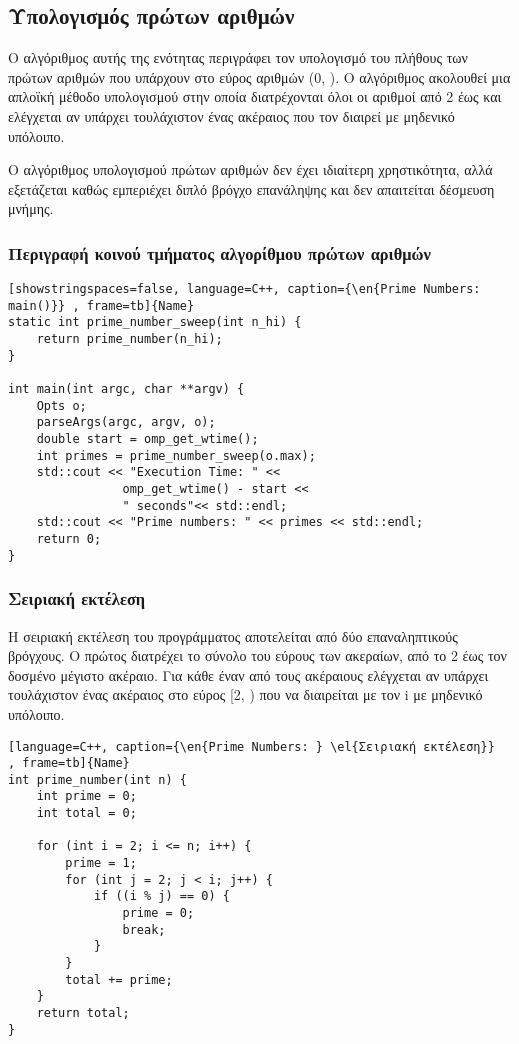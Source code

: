 \subsection{Υπολογισμός πρώτων αριθμών}
Ο αλγόριθμος αυτής της ενότητας περιγράφει τον υπολογισμό του πλήθους των πρώτων αριθμών που υπάρχουν στο εύρος αριθμών (0, ). Ο αλγόριθμος ακολουθεί μια απλοϊκή μέθοδο υπολογισμού στην οποία διατρέχονται όλοι οι αριθμοί από 2 έως  και ελέγχεται αν υπάρχει τουλάχιστον ένας ακέραιος που τον διαιρεί με μηδενικό υπόλοιπο.

Ο αλγόριθμος υπολογισμού πρώτων αριθμών δεν έχει ιδιαίτερη χρηστικότητα, αλλά εξετάζεται καθώς εμπεριέχει διπλό βρόγχο επανάληψης και δεν απαιτείται δέσμευση μνήμης.
\subsubsection{Περιγραφή κοινού τμήματος αλγορίθμου πρώτων αριθμών}
\begin{spacing}{1.0}
\begin{lstlisting}[showstringspaces=false, language=C++, caption={\en{Prime Numbers: main()}} , frame=tb]{Name}
static int prime_number_sweep(int n_hi) {
    return prime_number(n_hi);
}

int main(int argc, char **argv) {
    Opts o;
    parseArgs(argc, argv, o);
    double start = omp_get_wtime();
    int primes = prime_number_sweep(o.max);
    std::cout << "Execution Time: " << 
    			omp_get_wtime() - start << 
    			" seconds"<< std::endl;
    std::cout << "Prime numbers: " << primes << std::endl;
    return 0;
}

\end{lstlisting}
\end{spacing}
\clearpage
\subsubsection{Σειριακή εκτέλεση}
Η σειριακή εκτέλεση του προγράμματος αποτελείται από δύο επαναληπτικούς βρόγχους. Ο πρώτος διατρέχει το σύνολο του εύρους των ακεραίων, από το 2 έως τον δοσμένο μέγιστο ακέραιο. Για κάθε έναν από τους ακέραιους \emph{} ελέγχεται αν υπάρχει τουλάχιστον ένας ακέραιος στο εύρος [2, ) που να διαιρείται με τον i με μηδενικό υπόλοιπο.

\begin{spacing}{0.8}
\begin{lstlisting}[language=C++, caption={\en{Prime Numbers: } \el{Σειριακή εκτέλεση}}  , frame=tb]{Name}
int prime_number(int n) {
    int prime = 0;
    int total = 0;

    for (int i = 2; i <= n; i++) {
        prime = 1;
        for (int j = 2; j < i; j++) {
            if ((i % j) == 0) {
                prime = 0;
                break;
            }
        }
        total += prime;
    }
    return total;
}

\end{lstlisting}
\end{spacing}

